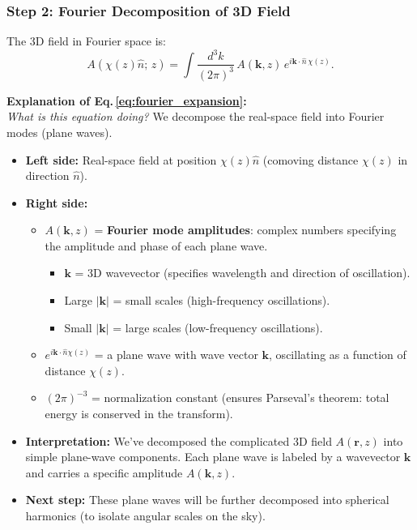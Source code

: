 \subsubsection{Step 2: Fourier Decomposition of 3D Field}

The 3D field in Fourier space is:
\begin{equation}
    A(\chi(z)\hat{n};\,z) = \int \frac{d^3k}{(2\pi)^3}\, A(\mathbf{k},z)\,
    e^{i\mathbf{k}\cdot\hat{n}\,\chi(z)}.
    \label{eq:fourier_expansion}
\end{equation}

\noindent\textbf{\large Explanation of Eq.\,\eqref{eq:fourier_expansion}:}\\
\textit{What is this equation doing?} We decompose the real-space field into Fourier modes (plane waves).
\begin{itemize}[leftmargin=1.5cm]
    \item \textbf{Left side:} Real-space field at position $\chi(z)\hat{n}$ (comoving distance $\chi(z)$ in direction $\hat{n}$).
    
    \item \textbf{Right side:}
        \begin{itemize}
            \item $A(\mathbf{k}, z)$ = \textbf{Fourier mode amplitudes}: complex numbers specifying the amplitude and phase of each plane wave.
                \begin{itemize}
                    \item $\mathbf{k}$ = 3D wavevector (specifies wavelength and direction of oscillation).
                    \item Large $|\mathbf{k}|$ = small scales (high-frequency oscillations).
                    \item Small $|\mathbf{k}|$ = large scales (low-frequency oscillations).
                \end{itemize}
            \item $e^{i\mathbf{k} \cdot \hat{n} \chi(z)}$ = a plane wave with wave vector $\mathbf{k}$, oscillating as a function of distance $\chi(z)$.
            \item $(2\pi)^{-3}$ = normalization constant (ensures Parseval's theorem: total energy is conserved in the transform).
        \end{itemize}
    
    \item \textbf{Interpretation:} We've decomposed the complicated 3D field $A(\mathbf{r}, z)$ into simple plane-wave components. Each plane wave is labeled by a wavevector $\mathbf{k}$ and carries a specific amplitude $A(\mathbf{k}, z)$.
    
    \item \textbf{Next step:} These plane waves will be further decomposed into spherical harmonics (to isolate angular scales on the sky).
\end{itemize}

